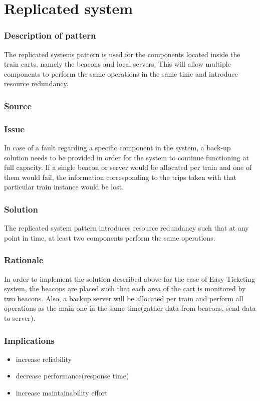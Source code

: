 
\section{Replicated system}

\subsubsection{Description of pattern}

The replicated systems pattern is used for the components located inside the train carts, namely the beacons and local servers. This will allow multiple components to perform the same operations in the same time and introduce resource redundancy.

\subsubsection{Source} \cite{book:design-patterns}

\subsubsection{Issue} 
In case of a fault regarding a specific component in the system, a back-up solution needs to be provided in order for the system to continue functioning at full capacity. If a single beacon or server would be allocated per train and one of them would fail, the information corresponding to the trips taken with that particular train instance would be lost.

\subsubsection{Solution}
The replicated system pattern introduces resource redundancy such that at any point in time, at least two components perform the same operations.

\subsubsection{Rationale}
In order to implement the solution described above for the case of Easy Ticketing system, the beacons are placed such that each area of the cart is monitored by two beacons. Also, a backup server will be allocated per train and perform all operations as the main one in the same time(gather data from beacons, send data to server).


\subsubsection{Implications}
\begin{itemize}
	\item increase reliability
	\item decrease performance(response time)
	\item increase maintainability effort
\end{itemize}


